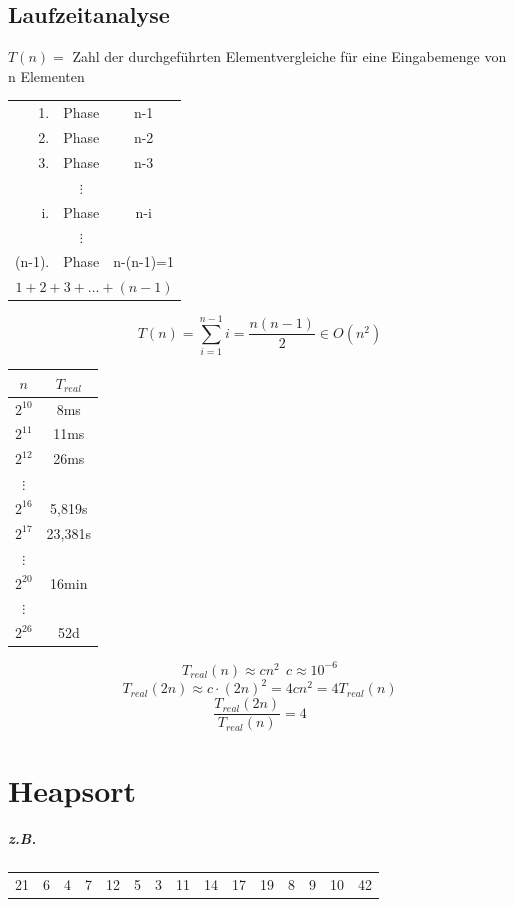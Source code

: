 \pagebreak

\section{Laufzeitanalyse}

$T(n) =$ Zahl der durchgeführten Elementvergleiche für eine Eingabemenge von n Elementen\\

\begin{tabular}{rcc}
	1.&Phase & n-1 \\
	2.&Phase & n-2 \\
	3.&Phase & n-3 \\
	 & $\vdots$ &  \\
	i.& Phase & n-i \\
	 & $\vdots$ &  \\
	(n-1).&Phase & n-(n-1)=1 \\ \hline
	\multicolumn{3}{c}{$1+2+3+\ldots+(n-1)$}
\end{tabular}
\[ T(n)=\sum_{i=1}^{n-1} i = \frac{n(n-1)}{2}\in O(n^2) \]
\begin{tabular}{c|c}
	$n$ & $T_{real}$ \\ \hline
	$2^{10}$ & 8ms \\
	$2^{11}$ & 11ms \\
	$2^{12}$ & 26ms \\
	$\vdots$ &  \\
	$2^{16}$ & 5,819s \\
	$2^{17}$ & 23,381s \\
	$\vdots$ &  \\
	$2^{20}$ & 16min \\
	$\vdots$ &  \\
	$2^{26}$ & 52d 
\end{tabular}
\[ T_{real}(n)\approx cn^2~~ c\approx10^{-6}\]
\[T_{real} (2n) \approx c \cdot (2n)^2 = 4 cn^2 = 4T_{real}(n) \]
\[\frac{T_{real}(2n)}{T_{real}(n)} = 4 \]



\chapter{Heapsort}
\label{sec:heapsort}

\paragraph{z.B.} \begin{tabular}{ccccccccccccccc}
	21&6&4&7&12&5&3&11&14&17&19&8&9&10&42
\end{tabular}

